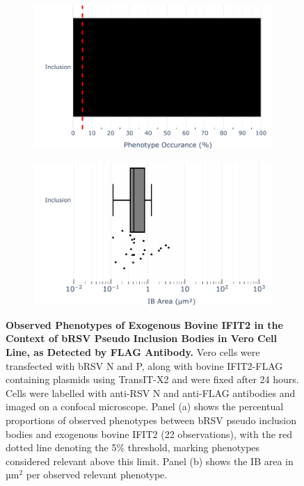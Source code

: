 \begin{figure}
    \begin{subfigure}{0.495\textwidth}
        \caption{}
        \includegraphics[width=1\linewidth]{09. Chapter 4/Figs/01. pIB/03. IFIT2/04. IFIT2-FLAG/03. FLAG/07. bar_bi2f_bnbp.pdf} 
    \end{subfigure}
    \begin{subfigure}{0.495\textwidth}
        \caption{}
        \includegraphics[width=1\linewidth]{09. Chapter 4/Figs/01. pIB/03. IFIT2/04. IFIT2-FLAG/03. FLAG/08. box_bi2f_bnbp.pdf}
    \end{subfigure}
    \caption[Observed Phenotypes of Exogenous Bovine IFIT2 in the Context of bRSV Pseudo Inclusion Bodies in Vero Cell Line, as Detected by FLAG Antibody.]{\textbf{Observed Phenotypes of Exogenous Bovine IFIT2 in the Context of bRSV Pseudo Inclusion Bodies in Vero Cell Line, as Detected by FLAG Antibody.} Vero cells were transfected with bRSV N and P, along with bovine IFIT2-FLAG containing plasmids using TransIT-X2 and were fixed after 24 hours. Cells were labelled with anti-RSV N and anti-FLAG antibodies and imaged on a confocal microscope. Panel (a) shows the percentual proportions of observed phenotypes between bRSV pseudo inclusion bodies and exogenous bovine IFIT2 (22 observations), with the red dotted line denoting the 5\% threshold, marking phenotypes considered relevant above this limit. Panel (b) shows the IB area in \(\mbox{µm}^2\) per observed relevant phenotype.}
    \label{fig:Observed Phenotypes of Exogenous Bovine IFIT2 in the Context of bRSV Pseudo Inclusion Bodies in Vero Cell Line, as Detected by FLAG Antibody}
\end{figure}

